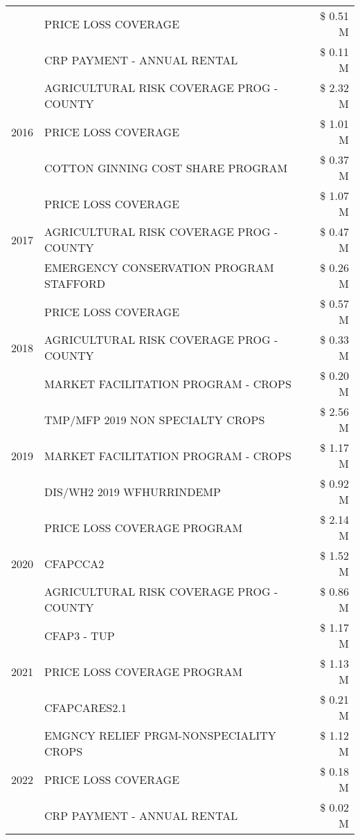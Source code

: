 \begin{tabular}{llr}
 & PRICE LOSS COVERAGE & \$ 0.51 M \\
 & CRP PAYMENT - ANNUAL RENTAL & \$ 0.11 M \\
\cline{1-3}
\multirow[t]{3}{*}{2016} & AGRICULTURAL RISK COVERAGE PROG - COUNTY & \$ 2.32 M \\
 & PRICE LOSS COVERAGE & \$ 1.01 M \\
 & COTTON GINNING COST SHARE PROGRAM & \$ 0.37 M \\
\cline{1-3}
\multirow[t]{3}{*}{2017} & PRICE LOSS COVERAGE & \$ 1.07 M \\
 & AGRICULTURAL RISK COVERAGE PROG - COUNTY & \$ 0.47 M \\
 & EMERGENCY CONSERVATION PROGRAM STAFFORD & \$ 0.26 M \\
\cline{1-3}
\multirow[t]{3}{*}{2018} & PRICE LOSS COVERAGE & \$ 0.57 M \\
 & AGRICULTURAL RISK COVERAGE PROG - COUNTY & \$ 0.33 M \\
 & MARKET FACILITATION PROGRAM - CROPS & \$ 0.20 M \\
\cline{1-3}
\multirow[t]{3}{*}{2019} & TMP/MFP 2019 NON SPECIALTY CROPS & \$ 2.56 M \\
 & MARKET FACILITATION PROGRAM - CROPS & \$ 1.17 M \\
 & DIS/WH2 2019 WFHURRINDEMP & \$ 0.92 M \\
\cline{1-3}
\multirow[t]{3}{*}{2020} & PRICE LOSS COVERAGE PROGRAM & \$ 2.14 M \\
 & CFAPCCA2 & \$ 1.52 M \\
 & AGRICULTURAL RISK COVERAGE PROG - COUNTY & \$ 0.86 M \\
\cline{1-3}
\multirow[t]{3}{*}{2021} & CFAP3 - TUP & \$ 1.17 M \\
 & PRICE LOSS COVERAGE PROGRAM & \$ 1.13 M \\
 & CFAPCARES2.1 & \$ 0.21 M \\
\cline{1-3}
\multirow[t]{3}{*}{2022} & EMGNCY RELIEF PRGM-NONSPECIALITY CROPS & \$ 1.12 M \\
 & PRICE LOSS COVERAGE & \$ 0.18 M \\
 & CRP PAYMENT - ANNUAL RENTAL & \$ 0.02 M \\
\cline{1-3}
\bottomrule
\end{tabular}
